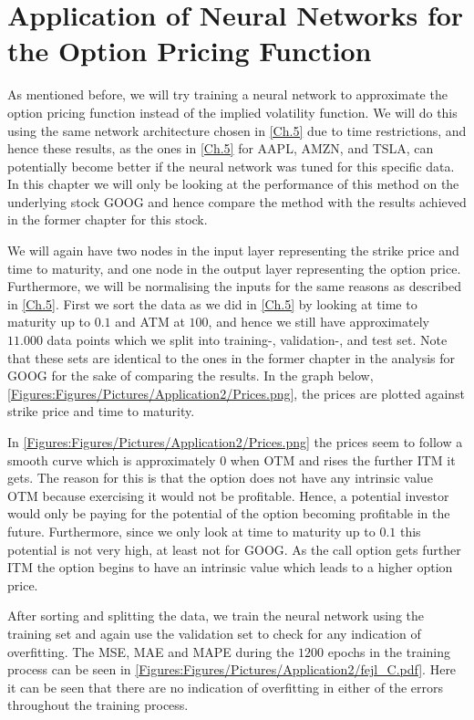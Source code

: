 \chapter{Application of Neural Networks for the Option Pricing Function}\label{Ch:app2}
As mentioned before, we will try training a neural network to approximate the option pricing function instead of the implied volatility function. We will do this using the same network architecture chosen in \autoref{Ch.5} due to time restrictions, and hence these results, as the ones in \autoref{Ch.5} for AAPL, AMZN, and TSLA, can potentially become better if the neural network was tuned for this specific data. In this chapter we will only be looking at the performance of this method on the underlying stock GOOG and hence compare the method with the results achieved in the former chapter for this stock.

We will again have two nodes in the input layer representing the strike price and time to maturity, and one node in the output layer representing the option price. Furthermore, we will be normalising the inputs for the same reasons as described in \autoref{Ch.5}. First we sort the data as we did in \autoref{Ch.5} by looking at time to maturity up to $0.1$ and ATM at $100$, and hence we still have approximately $11.000$ data points which we split into training-, validation-, and test set. Note that these sets are identical to the ones in the former chapter in the analysis for GOOG for the sake of comparing the results. In the graph below, \autoref{Figures:Figures/Pictures/Application2/Prices.png}, the prices are plotted against strike price and time to maturity.


In \autoref{Figures:Figures/Pictures/Application2/Prices.png} the prices seem to follow a smooth curve which is approximately $0$ when OTM and rises the further ITM it gets. The reason for this is that the option does not have any intrinsic value OTM because exercising it would not be profitable. Hence, a potential investor would only be paying for the potential of the option becoming profitable in the future. Furthermore, since we only look at time to maturity up to $0.1$ this potential is not very high, at least not for GOOG. As the call option gets further ITM the option begins to have an intrinsic value which leads to a higher option price.

After sorting and splitting the data, we train the neural network using the training set and again use the validation set to check for any indication of overfitting. The MSE, MAE and MAPE during the $1200$ epochs in the training process can be seen in \autoref{Figures:Figures/Pictures/Application2/fejl_C.pdf}. Here it can be seen that there are no indication of overfitting in either of the errors throughout the training process. 

